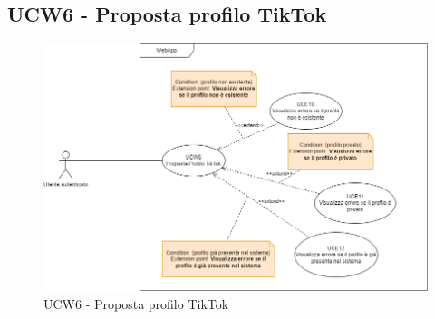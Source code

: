 \subsection{UCW6 - Proposta profilo TikTok}
\begin{figure}[!h]
\centering
\includegraphics[scale=0.5]{UC_images/UCW6.png}
\caption{UCW6 - Proposta profilo TikTok}
\end{figure}
